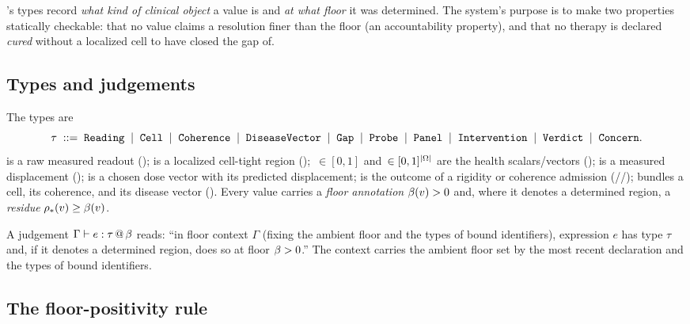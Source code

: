 's types record \emph{what kind of clinical object} a value is and
\emph{at what floor} it was determined. The system's purpose is to make two
properties statically checkable: that no value claims a resolution finer than
the floor (an accountability property), and that no therapy is declared
\emph{cured} without a localized cell to have closed the gap of.

\subsection{Types and judgements}

\begin{definition}[Types]
\label{cfc:def:types}
The  types are
\[
\tau \;::=\; \texttt{Reading}\;\mid\;\texttt{Cell}\;\mid\;\texttt{Coherence}\;\mid\;\texttt{DiseaseVector}
   \;\mid\;\texttt{Gap}\;\mid\;\texttt{Probe}\;\mid\;\texttt{Panel}\;\mid\;\texttt{Intervention}
   \;\mid\;\texttt{Verdict}\;\mid\;\texttt{Concern}.
\]
 is a raw measured readout ();  is a
localized cell-tight region (); \,$\in[0,1]$ and
\,$\in[0,1]^{|\Omega|}$ are the health scalars/vectors
();  is a measured displacement
();  is a chosen dose vector with its predicted
displacement;  is the outcome of a rigidity or coherence admission
(//);  bundles a cell, its
coherence, and its disease vector (). Every value carries a
\emph{floor annotation} $\beta(v)>0$ and, where it denotes a determined region,
a \emph{residue} $\rho_{\ast}(v)\ge\beta(v)$.
\end{definition}

\begin{definition}
\label{cfc:def:judgement}
A judgement $\Gamma\vdash e:\tau\,@\,\beta$ reads: ``in floor context $\Gamma$
(fixing the ambient floor and the types of bound identifiers), expression $e$
has type $\tau$ and, if it denotes a determined region, does so at floor
$\beta>0$.'' The context carries the ambient floor set by the most recent
 declaration and the types of bound identifiers.
\end{definition}

\subsection{The floor-positivity rule}

